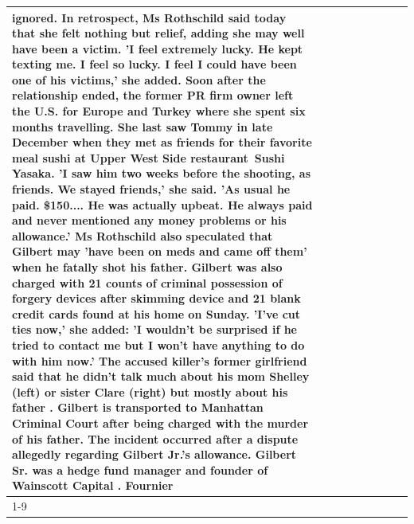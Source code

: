 \begin{table}[H]
\begin{tabular}{lllrlllll}
ignored. In retrospect, Ms Rothschild said today that she felt nothing but relief, adding she may well have been a victim. 'I feel extremely lucky. He kept texting me. I feel so lucky. I feel I could have been one of his victims,' she added. Soon after the relationship ended, the former PR firm owner left the U.S. for Europe and Turkey where she spent six months  travelling. She last saw Tommy in late December when they met as friends for their favorite meal sushi at Upper West Side restaurant Sushi Yasaka. 'I saw him two weeks before the shooting, as friends. We stayed friends,' she said. 'As usual he paid. \$150.... He was actually upbeat. He always paid and never mentioned any money problems or his allowance.' Ms Rothschild also speculated that Gilbert may 'have been on meds and came off them' when he fatally shot his father. Gilbert was also charged with 21 counts of criminal possession of forgery devices after skimming device and 21 blank credit cards found at his home on Sunday. 'I've cut ties now,' she added: 'I wouldn’t be surprised if he tried to contact me but I won’t have anything to do with him now.' The accused killer's former girlfriend said that he didn't talk much about his mom Shelley (left) or sister Clare (right) but mostly about his father . Gilbert is transported to Manhattan Criminal Court  after being charged with the murder of his father. The incident occurred after a dispute allegedly regarding Gilbert Jr.'s allowance. Gilbert Sr. was a hedge fund manager and founder of Wainscott Capital . Fournier \\
\cline{1-9}

\end{tabular}
\end{table}
